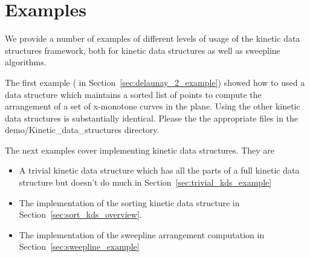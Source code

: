 \section{Examples}
\label{sec:examples}

We provide a number of examples of different levels of usage of the
kinetic data structures framework, both for kinetic data structures as
well as sweepline algorithms.

The first example ( in Section~\ref{sec:delaunay_2_example}) showed
how to used a data structure which maintains a sorted list of points
to compute the arrangement of a set of x-monotone curves in the
plane. Using the other kinetic data structures is substantially
identical. Please the the appropriate files in the
demo/Kinetic\_data\_structures directory.

The next examples cover implementing kinetic data structures. They are
\begin{itemize}
\item A trivial kinetic data structure which has all the parts of a
full kinetic data structure but doesn't do much in
Section~\ref{sec:trivial_kds_example}
\item The implementation of the sorting kinetic data structure in
Section~\ref{sec:sort_kds_overview}.
\item The implementation of the sweepline arrangement computation in
  Section~\ref{sec:sweepline_example}
\end{itemize}






